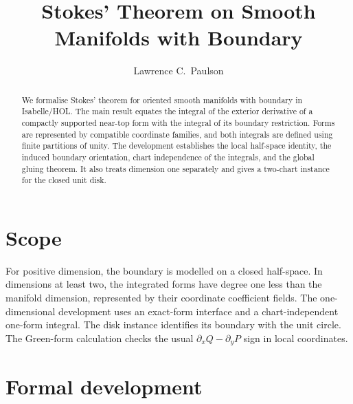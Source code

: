 \documentclass[11pt,a4paper]{article}
\begin{document}
\title{Stokes' Theorem on Smooth Manifolds with Boundary}
\author{Lawrence C.\ Paulson}
\maketitle

\begin{abstract}
We formalise Stokes' theorem for oriented smooth manifolds with boundary
in Isabelle/HOL. The main result equates the integral of the exterior
derivative of a compactly supported near-top form with the integral of
its boundary restriction. Forms are represented by compatible
coordinate families, and both integrals are defined using finite
partitions of unity. The development establishes the local half-space
identity, the induced boundary orientation, chart independence of the
integrals, and the global gluing theorem. It also treats dimension one
separately and gives a two-chart instance for the closed unit disk.
\end{abstract}

\section{Scope}

For positive dimension, the boundary is modelled on a closed
half-space. In dimensions at least two, the integrated forms have
degree one less than the manifold dimension, represented by their
coordinate coefficient fields. The one-dimensional development uses
an exact-form interface and a chart-independent one-form integral.
The disk instance identifies its boundary with the unit circle.
The Green-form calculation checks the usual
$\partial_x Q-\partial_y P$ sign in local coordinates.

\section{Formal development}


\end{document}
